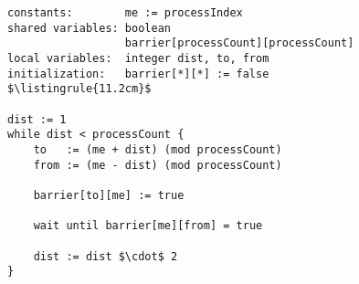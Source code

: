 \begin{center}
\begin{minipage}{\textwidth}
\begin{lstlisting}[mathescape, linewidth=11.2cm]
constants:        me := processIndex
shared variables: boolean
                  barrier[processCount][processCount]
local variables:  integer dist, to, from
initialization:   barrier[*][*] := false
$\listingrule{11.2cm}$

dist := 1
while dist < processCount {
	to   := (me + dist) (mod processCount)
	from := (me - dist) (mod processCount)
	
	barrier[to][me] := true
	
	wait until barrier[me][from] = true

	dist := dist $\cdot$ 2
}
\end{lstlisting}
\end{minipage}
\end{center}
